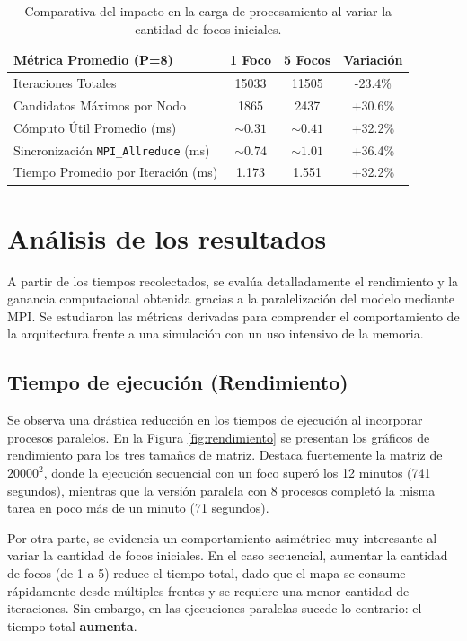 \documentclass[10pt,a4paper]{article}
\begin{document}
\begin{table}[H]
\centering
\begin{tabular}{|l|c|c|c|}
\hline
\textbf{Métrica Promedio (P=8)} & \textbf{1 Foco} & \textbf{5 Focos} & \textbf{Variación} \\ \hline
Iteraciones Totales & 15033 & 11505 & -23.4\% \\ \hline
Candidatos Máximos por Nodo & 1865 & 2437 & +30.6\% \\ \hline
Cómputo Útil Promedio (ms) & $\sim0.31$ & $\sim0.41$ & +32.2\% \\ \hline
Sincronización \texttt{MPI\_Allreduce} (ms) & $\sim0.74$ & $\sim1.01$ & +36.4\% \\ \hline
Tiempo Promedio por Iteración (ms) & 1.173 & 1.551 & +32.2\% \\ \hline
\end{tabular}
\caption{Comparativa del impacto en la carga de procesamiento al variar la cantidad de focos iniciales.}
\label{tab:comparativa_focos}
\end{table}
\space
\section{Análisis de los resultados}

A partir de los tiempos recolectados, se evalúa detalladamente el rendimiento y la ganancia computacional obtenida gracias a la paralelización del modelo mediante MPI. Se estudiaron las métricas derivadas para comprender el comportamiento de la arquitectura frente a una simulación con un uso intensivo de la memoria.

\subsection{Tiempo de ejecución (Rendimiento)}
Se observa una drástica reducción en los tiempos de ejecución al incorporar procesos paralelos. En la Figura \ref{fig:rendimiento} se presentan los gráficos de rendimiento para los tres tamaños de matriz. Destaca fuertemente la matriz de $20000^2$, donde la ejecución secuencial con un foco superó los 12 minutos (741 segundos), mientras que la versión paralela con 8 procesos completó la misma tarea en poco más de un minuto (71 segundos). 

Por otra parte, se evidencia un comportamiento asimétrico muy interesante al variar la cantidad de focos iniciales. En el caso secuencial, aumentar la cantidad de focos (de 1 a 5) reduce el tiempo total, dado que el mapa se consume rápidamente desde múltiples frentes y se requiere una menor cantidad de iteraciones. Sin embargo, en las ejecuciones paralelas sucede lo contrario: el tiempo total \textbf{aumenta}. 
\end{document}
